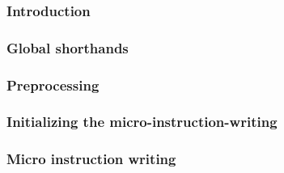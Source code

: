 \subsubsection{Introduction}                                     \label{mmu: instructions: ram to ram sans padding: intro}                            
\subsubsection{Global shorthands}                                \label{mmu: instructions: ram to ram sans padding: global shorthands}                
\subsubsection{Preprocessing}                                    \label{mmu: instructions: ram to ram sans padding: preprocessing}                    
\subsubsection{Initializing the micro-instruction-writing}       \label{mmu: instructions: ram to ram sans padding: initialization}                   
\subsubsection{Micro instruction writing}                        \label{mmu: instructions: ram to ram sans padding: micro instruction writing}        
